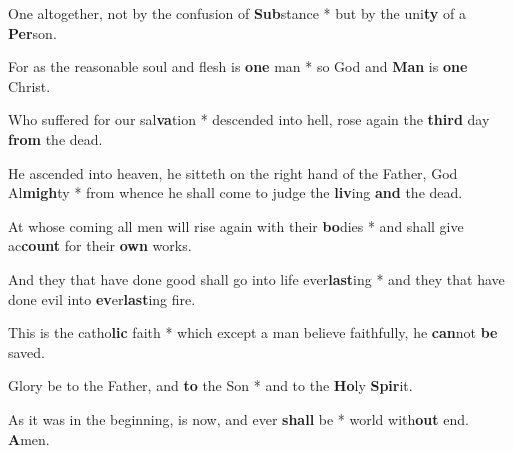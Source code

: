 \begin{multicols}{2}
	One altogether, not by the confusion of \textbf{Sub}stance * but by the uni\textbf{ty} of a \textbf{Per}son.
	
	For as the reasonable soul and flesh is \textbf{one} man * so God and \textbf{Man} is \textbf{one} Christ.
	
	Who suffered for our sal\textbf{va}tion * descended into hell, rose again the \textbf{third} day \textbf{from} the dead.
	
	He ascended into heaven, he sitteth on the right hand of the Father, God Al\textbf{migh}ty * from whence he shall come to judge the \textbf{liv}ing \textbf{and} the dead.
	
	At whose coming all men will rise again with their \textbf{bo}dies * and shall give ac\textbf{count} for their \textbf{own} works.
	
	And they that have done good shall go into life ever\textbf{last}ing * and they that have done evil into \textbf{ev}er\textbf{last}ing fire.
	
	This is the catho\textbf{lic} faith * which except a man believe faithfully, he \textbf{can}not \textbf{be} saved.
	
	Glory be to the Father, and \textbf{to} the Son * and to the \textbf{Ho}ly \textbf{Spir}it.
	
	As it was in the beginning, is now, and ever \textbf{shall} be * world with\textbf{out} end. \textbf{A}men.
\end{multicols}